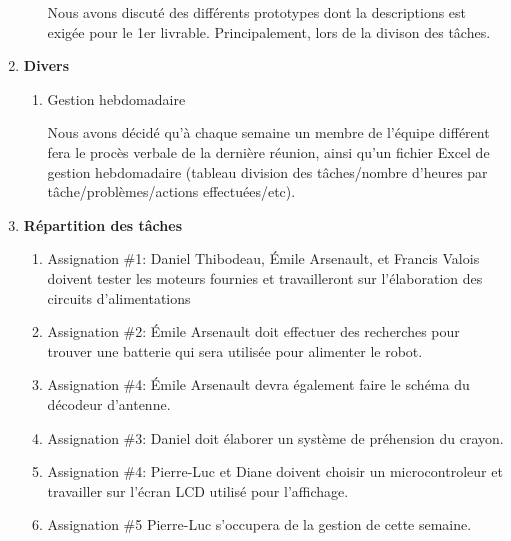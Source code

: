 \documentclass[12pt]{ULojpv}
\begin{document}
\begin{enumerate}
\begin{enumerate}
Nous avons discuté des différents prototypes dont la descriptions est exigée pour le 1er livrable. Principalement, lors de la divison des tâches.

\end{enumerate}


\item \textbf{Divers}

\begin{enumerate}

\item Gestion hebdomadaire

Nous avons décidé qu'à chaque semaine un membre de l'équipe différent fera le procès verbale de la dernière réunion, ainsi qu'un fichier Excel de gestion hebdomadaire (tableau division des tâches/nombre d'heures par tâche/problèmes/actions effectuées/etc).

\end{enumerate}

\item \textbf{Répartition des tâches}

\begin{enumerate}

\item Assignation \#1: Daniel Thibodeau, Émile Arsenault, et Francis Valois doivent tester les moteurs fournies et travailleront sur l'élaboration des circuits d'alimentations

\item Assignation \#2: Émile Arsenault doit effectuer des recherches pour trouver une batterie qui sera utilisée pour alimenter le robot.

\item Assignation \#4: Émile Arsenault devra également faire le schéma du décodeur d'antenne.

\item Assignation \#3: Daniel doit élaborer un système de préhension du crayon.

\item Assignation \#4: Pierre-Luc et Diane doivent choisir un microcontroleur et travailler sur l'écran LCD utilisé pour l'affichage.

\item Assignation \#5 Pierre-Luc s'occupera de la gestion de cette semaine.


\end{enumerate}
\end{enumerate}
\end{document}

